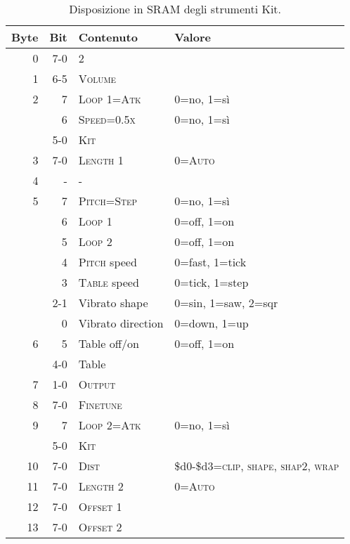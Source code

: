 \begin{table}
	\begin{center}
		\caption{Disposizione in SRAM degli strumenti Kit.}
		\begin{tabular}{r|r|l|l}
			\toprule
   Byte & Bit	  & Contenuto 		& Valore \\
   \midrule
      0	& 7-0 	& 2 			& \\
      1	& 6-5 	& \textsc{Volume} 	& \\
      2	& 7   	& \textsc{Loop 1=Atk} 	& 0=no, 1=sì \\
	& 6   	& \textsc{Speed=0.5x} 	& 0=no, 1=sì \\
	& 5-0 	& \textsc{Kit} 		& \\
      3	& 7-0 	& \textsc{Length 1} 	& 0=\textsc{Auto} \\
      4	& -   	& - 			& \\
      5	& 7   	& \textsc{Pitch=Step} 	& 0=no, 1=sì \\
	& 6   	& \textsc{Loop 1} 	& 0=off, 1=on \\
	& 5   	& \textsc{Loop 2} 	& 0=off, 1=on \\
	& 4   	& \textsc{Pitch} speed	& 0=fast, 1=tick \\
	& 3   	& \textsc{Table} speed	& 0=tick, 1=step \\
	& 2-1 	& Vibrato shape		& 0=sin, 1=saw, 2=sqr \\
	& 0   	& Vibrato direction	& 0=down, 1=up \\
      6	& 5   	& Table off/on		& 0=off, 1=on \\
	& 4-0 	& Table			& \\
      7	& 1-0 	& \textsc{Output}	& \\
      8	& 7-0 	& \textsc{Finetune}	& \\
      9	& 7   	& \textsc{Loop 2=Atk} 	& 0=no, 1=sì \\
	& 5-0 	& \textsc{Kit} 		& \\
     10	& 7-0 	& \textsc{Dist} 	& \$d0-\$d3=\textsc{clip, shape, shap2, wrap} \\
     11	& 7-0 	& \textsc{Length 2} 	& 0=\textsc{Auto} \\
     12	& 7-0 	& \textsc{Offset 1} 	& \\
     13	& 7-0 	& \textsc{Offset 2} 	& \\
   \bottomrule
		\end{tabular}
	\end{center}
\end{table}

